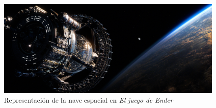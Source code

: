\documentclass[letterpaper]{article}
\begin{document}
\begin{enumerate}
\begin{figure}[h]
\centering
\includegraphics[scale=0.4]{ender.jpg}
\caption{Representación de la nave espacial en \emph{El juego de Ender}}
\end{figure}



\end{enumerate}
\end{document}
